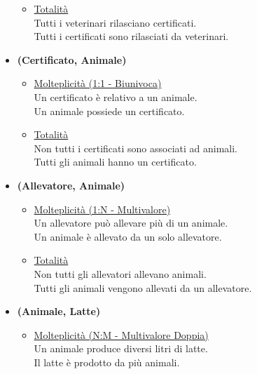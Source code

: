 \documentclass[12pt]{report}
\begin{document}
\begin{itemize}
\begin{itemize}
		\item \underline{Totalità} \\ [2mm]
			Tutti i veterinari rilasciano certificati. \\
            Tutti i certificati sono rilasciati da veterinari. \\
	\end{itemize}
	
\item \textbf{(Certificato, Animale)} 
	\begin{itemize}
		\item \underline{Molteplicità (1:1 - Biunivoca) } \\ [2mm]
			Un certificato è relativo a un animale.\\
			Un animale possiede un certificato.\\
            
		\item \underline{Totalità} \\ [2mm]
			Non tutti i certificati sono associati ad animali.\\
			Tutti gli animali hanno un certificato.\\
	\end{itemize}

\newpage
	
\item \textbf{(Allevatore, Animale)} 
	\begin{itemize}
		\item \underline{Molteplicità (1:N - Multivalore) } \\ [2mm]
			Un allevatore può allevare più di un animale.\\
			Un animale è allevato da un solo allevatore.\\
            
		\item \underline{Totalità} \\ [2mm]
			Non tutti gli allevatori allevano animali.\\
			Tutti gli animali vengono allevati da un allevatore.\\
	\end{itemize}
	
\item \textbf{(Animale, Latte) }
	\begin{itemize}
		\item \underline{Molteplicità (N:M - Multivalore Doppia)} \\ [2mm]
			Un animale produce diversi litri di latte.\\
            Il latte è prodotto da più animali.\\


\end{itemize}
\end{itemize}
\end{document}
